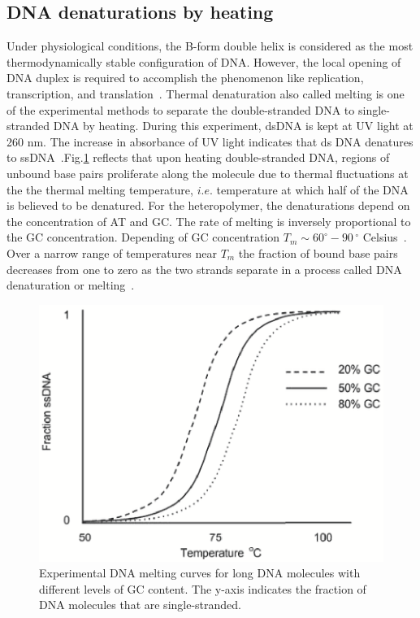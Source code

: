 \documentclass[12pt,masters,final]{UTRGVthesis}
\begin{document}
\subsection{DNA denaturations by heating}
Under physiological conditions, the B-form double helix is considered as the most thermodynamically stable configuration of DNA. However, the local opening of DNA duplex is required to accomplish the phenomenon like replication, transcription, and translation~\cite{Alberts:2015}. Thermal denaturation also called melting is one of the experimental methods to separate the double-stranded DNA to single-stranded  DNA by heating. During this experiment, dsDNA is kept at UV light at 260 nm. The increase in absorbance of UV light indicates that ds DNA denatures to ssDNA~\cite{peyrard2004nonlinear,dauxois1995entropy}.Fig.\ref{fig:DNA thermal melting} reflects that 
upon heating double-stranded DNA, regions of unbound 
base pairs proliferate along the molecule due to thermal fluctuations at the 
the thermal melting temperature, $ i.e.$ temperature at which half of the DNA is believed to be denatured. For the heteropolymer, the denaturations depend on the concentration of AT and GC. The rate of melting is inversely proportional to the GC concentration. Depending of GC concentration $T_m \sim 60^{\circ} - 90$\,$^{\circ}$ Celsius~\cite{DB:1991}. Over a narrow range of temperatures near $T_m$
the fraction of bound base pairs decreases from one to zero as the two strands separate
in a process called DNA denaturation or melting~\cite{Wartell:1985}.
\begin{figure}[!h]
  \includegraphics[width=0.65 \textwidth]{dna_thermal_melting.eps}
  \caption{\small Experimental DNA melting curves for long DNA molecules with different levels of GC content.
The y-axis indicates the fraction of DNA molecules that are single-stranded. }
  \label{fig:DNA thermal melting}
\end{figure}
%
\newpage
\end{document}
